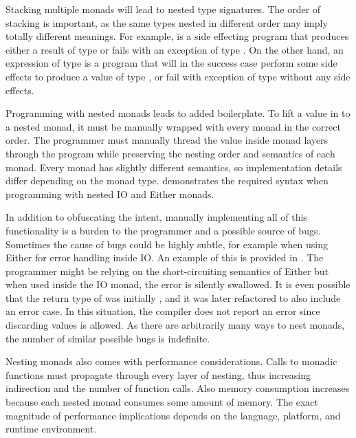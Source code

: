Stacking multiple monads will lead to nested type signatures. The order of stacking is important, as the same types nested in different order may imply totally different meanings. For example,  is a side effecting program that produces either a result of type  or fails with an exception of type . On the other hand, an expression of type  is a program that will in the success case perform some side effects to produce a value of type , or fail with exception of type  without any side effects.

Programming with nested monads leads to added boilerplate. To lift a value in to a nested monad, it must be manually wrapped with every monad in the correct order. The programmer must manually thread the value inside monad layers through the program while preserving the nesting order and semantics of each monad. Every monad has slightly different semantics, so implementation details differ depending on the monad type.  demonstrates the required syntax when programming with nested IO and Either monads.



In addition to obfuscating the intent, manually implementing all of this functionality is a burden to the programmer and a possible source of bugs. Sometimes the cause of bugs could be highly subtle, for example when using Either for error handling inside IO. An example of this is provided in . The programmer might be relying on the short-circuiting semantics of Either but when used inside the IO monad, the error is silently swallowed. It is even possible that the return type of  was initially , and it was later refactored to also include an error case. In this situation, the compiler does not report an error since discarding values is allowed. As there are arbitrarily many ways to nest monads, the number of similar possible bugs is indefinite.



Nesting monads also comes with performance considerations. Calls to monadic functions must propagate through every layer of nesting, thus increasing indirection and the number of function calls. Also memory consumption increases because each nested monad consumes some amount of memory. The exact magnitude of performance implications depends on the language, platform, and runtime environment.

